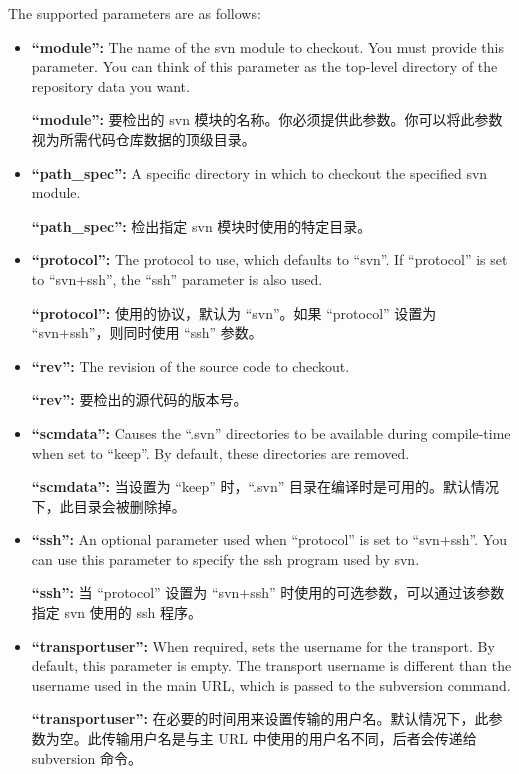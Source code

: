 The supported parameters are as follows:
\begin{itemize}
\setlength\itemsep{1.0em}

\item \textbf{``module'':} The name of the svn module to checkout. You must provide this parameter. You can think of this parameter as the top-level directory of the repository data you want.

\medskip
\textbf{``module'':} 要检出的 svn 模块的名称。你必须提供此参数。你可以将此参数视为所需代码仓库数据的顶级目录。

\item \textbf{``path\_spec'':} A specific directory in which to checkout the specified svn module.

\medskip
\textbf{``path\_spec'':} 检出指定 svn 模块时使用的特定目录。

\item \textbf{``protocol'':} The protocol to use, which defaults to ``svn''. If ``protocol'' is set to ``svn+ssh'', the ``ssh'' parameter is also used.

\medskip
\textbf{``protocol'':} 使用的协议，默认为 ``svn''。如果 ``protocol'' 设置为 ``svn+ssh''，则同时使用 ``ssh'' 参数。


\item \textbf{``rev'':} The revision of the source code to checkout.

\medskip
\textbf{``rev'':} 要检出的源代码的版本号。

\item \textbf{``scmdata'':} Causes the ``.svn'' directories to be available during compile-time when set to ``keep''. By default, these directories are removed.

\medskip
\textbf{``scmdata'':} 当设置为 ``keep'' 时，``.svn'' 目录在编译时是可用的。默认情况下，此目录会被删除掉。


\item \textbf{``ssh'':} An optional parameter used when ``protocol'' is set to ``svn+ssh''. You can use this parameter to specify the ssh program used by svn.

\medskip
\textbf{``ssh'':} 当 ``protocol'' 设置为 ``svn+ssh'' 时使用的可选参数，可以通过该参数指定 svn 使用的 ssh 程序。


\item \textbf{``transportuser'':} When required, sets the username for the transport. By default, this parameter is empty. The transport username is different than the username used in the main URL, which is passed to the subversion command.

\medskip
\textbf{``transportuser'':} 在必要的时间用来设置传输的用户名。默认情况下，此参数为空。此传输用户名是与主 URL 中使用的用户名不同，后者会传递给 subversion 命令。
\end{itemize}

